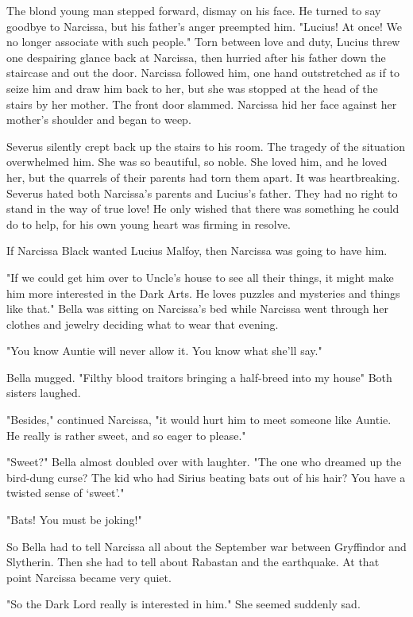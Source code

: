 The blond young man stepped forward, dismay on his face. He turned to say goodbye to Narcissa, but his father's anger preempted him. "Lucius! At once! We no longer associate with such people." Torn between love and duty, Lucius threw one despairing glance back at Narcissa, then hurried after his father down the staircase and out the door. Narcissa followed him, one hand outstretched as if to seize him and draw him back to her, but she was stopped at the head of the stairs by her mother. The front door slammed. Narcissa hid her face against her mother's shoulder and began to weep.

Severus silently crept back up the stairs to his room. The tragedy of the situation overwhelmed him. She was so beautiful, so noble. She loved him, and he loved her, but the quarrels of their parents had torn them apart. It was heartbreaking. Severus hated both Narcissa's parents and Lucius's father. They had no right to stand in the way of true love! He only wished that there was something he could do to help, for his own young heart was firming in resolve.

If Narcissa Black wanted Lucius Malfoy, then Narcissa was going to have him.

"If we could get him over to Uncle's house to see all their things, it might make him more interested in the Dark Arts. He loves puzzles and mysteries and things like that." Bella was sitting on Narcissa's bed while Narcissa went through her clothes and jewelry deciding what to wear that evening.

"You know Auntie will never allow it. You know what she'll say."

Bella mugged. "Filthy blood traitors bringing a half-breed into my house{\el}" Both sisters laughed.

"Besides," continued Narcissa, "it would hurt him to meet someone like Auntie. He really is rather sweet, and so eager to please."

"Sweet?" Bella almost doubled over with laughter. "The one who dreamed up the bird-dung curse? The kid who had Sirius beating bats out of his hair? You have a twisted sense of `sweet'."

"Bats! You must be joking!"

So Bella had to tell Narcissa all about the September war between Gryffindor and Slytherin. Then she had to tell about Rabastan and the earthquake. At that point Narcissa became very quiet.

"So the Dark Lord really is interested in him." She seemed suddenly sad.

